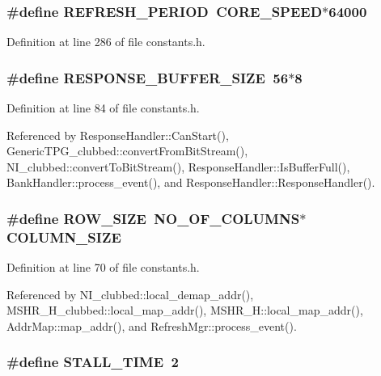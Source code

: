 \subsubsection[{REFRESH\_\-PERIOD}]{\setlength{\rightskip}{0pt plus 5cm}\#define REFRESH\_\-PERIOD~CORE\_\-SPEED$\ast$64000}\label{constants_8h_4ca70e92b8b779d01eed94f5f07a03ed}




Definition at line 286 of file constants.h.
\subsubsection[{RESPONSE\_\-BUFFER\_\-SIZE}]{\setlength{\rightskip}{0pt plus 5cm}\#define RESPONSE\_\-BUFFER\_\-SIZE~56$\ast$8}\label{constants_8h_3d9d93e9a53461ba2177521472b761c4}




Definition at line 84 of file constants.h.

Referenced by ResponseHandler::CanStart(), GenericTPG\_\-clubbed::convertFromBitStream(), NI\_\-clubbed::convertToBitStream(), ResponseHandler::IsBufferFull(), BankHandler::process\_\-event(), and ResponseHandler::ResponseHandler().
\subsubsection[{ROW\_\-SIZE}]{\setlength{\rightskip}{0pt plus 5cm}\#define ROW\_\-SIZE~NO\_\-OF\_\-COLUMNS$\ast$COLUMN\_\-SIZE}\label{constants_8h_a4d030604a90c8d019d90fc721900d63}




Definition at line 70 of file constants.h.

Referenced by NI\_\-clubbed::local\_\-demap\_\-addr(), MSHR\_\-H\_\-clubbed::local\_\-map\_\-addr(), MSHR\_\-H::local\_\-map\_\-addr(), AddrMap::map\_\-addr(), and RefreshMgr::process\_\-event().
\subsubsection[{STALL\_\-TIME}]{\setlength{\rightskip}{0pt plus 5cm}\#define STALL\_\-TIME~2}\label{constants_8h_a7157d228b08e0908de40a3a7cc280a8}




